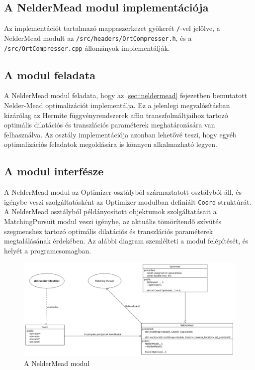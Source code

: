 \documentclass[oneside,titlepage,12pt,a4paper]{report}
\begin{document}
\subsection{A NelderMead modul implementációja} \label{subsec::nelderimp}

Az implementációt tartalmazó mappaszerkezet gyökerét \texttt{/}-vel jelölve, a NelderMead modult  az \texttt{/src/headers/OrtCompresser.h}, és a \texttt{/src/OrtCompresser.cpp} állományok implementálják.

\subsection*{A modul feladata}

\par A NelderMead modul feladata, hogy az \ref{sec::neldermead} fejezetben bemutatott Nelder-Mead optimalizációt implementálja. Ez a jelenlegi megvalósításban kizárólag az Hermite függvényrendszerek affin transzfolmáltjaihoz tartozó optimális dilatációs és transzlációs paraméterek meghatározására van felhasználva. Az osztály implementációja azonban lehetővé teszi, hogy egyéb optimalizációs feladatok megoldására is könnyen alkalmazható legyen.

\subsection*{A modul interfésze}

\par A NelderMead modul az Optimizer osztályból származtatott osztályból áll, és igénybe veszi szolgáltatásként az Optimizer modulban definiált \texttt{Coord} struktúrát. A NelderMead osztályból példányosított objektumok szolgáltatásait a MatchingPursuit modul veszi igénybe, az aktuális tömörítendő szívütés szegmenshez tartozó optimális dilatációs és transzlációs paraméterek megtalálásának érdekében. Az alábbi diagram szemlélteti a modul felépítését, és helyét a programcsomagban.

\begin{figure}[H] \label{NelderMeadUML}
\begin{center}
  \includegraphics[width=150mm]{./Abrak/UML/NelderMead.png}
  \caption{A NelderMead modul}
\end{center}
\end{figure} 
\end{document}
